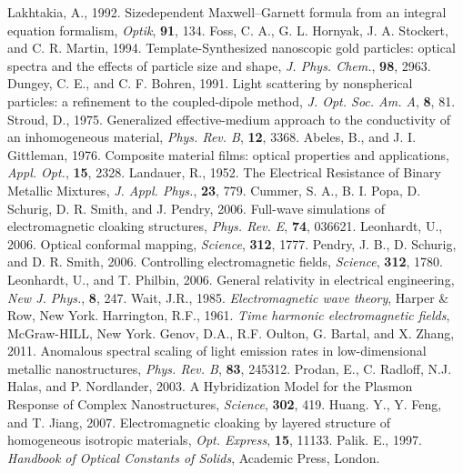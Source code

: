 \begin{thebibliography}{99}
Lakhtakia, A., 1992. Size\textendash dependent Maxwell–Garnett formula from an integral equation formalism, \textit{Optik}, \textbf{91}, 134.
Foss, C. A., G. L. Hornyak, J. A. Stockert, and C. R. Martin, 1994. Template-Synthesized nanoscopic gold particles: optical spectra and the effects of particle size and shape, \textit{J. Phys. Chem.}, \textbf{98}, 2963.
Dungey, C. E., and C. F. Bohren,  1991. Light scattering by nonspherical particles: a refinement to the coupled-dipole method, \textit{J. Opt. Soc. Am. A}, \textbf{8}, 81.
Stroud, D., 1975. Generalized effective-medium approach to the conductivity of an inhomogeneous material, \textit{Phys. Rev. B}, \textbf{12}, 3368.
Abeles, B., and J. I. Gittleman, 1976. Composite material films: optical properties and applications, \textit{Appl. Opt.}, \textbf{15}, 2328.
Landauer, R., 1952. The Electrical Resistance of Binary Metallic Mixtures, \textit{J. Appl. Phys.}, \textbf{23}, 779.
Cummer, S. A., B. I. Popa, D. Schurig, D. R. Smith, and J. Pendry, 2006. Full-wave simulations of electromagnetic cloaking structures,
\textit{Phys. Rev. E}, \textbf{74}, 036621.
Leonhardt, U., 2006. Optical conformal mapping,
\textit{Science}, \textbf{312}, 1777.
Pendry, J. B., D. Schurig, and D. R. Smith, 2006. Controlling electromagnetic fields, \textit{Science}, \textbf{312}, 1780.
Leonhardt, U., and T. Philbin, 2006. General relativity in electrical engineering, \textit{New J. Phys.}, \textbf{8}, 247.
Wait, J.R., 1985. \textit{Electromagnetic wave theory}, Harper \& Row, New York.
Harrington, R.F., 1961. \textit{Time harmonic electromagnetic fields}, McGraw-HILL, New York.
Genov, D.A.,  R.F. Oulton, G. Bartal, and X. Zhang, 2011.
Anomalous spectral scaling of light emission rates in low-dimensional metallic nanostructures, \textit{Phys. Rev. B}, \textbf{83}, 245312.
Prodan, E.,  C.  Radloff, N.J. Halas,  and P. Nordlander,  2003.
A Hybridization Model for the Plasmon Response of Complex Nanostructures, \textit{Science}, \textbf{302}, 419.
Huang. Y., Y. Feng, and T. Jiang, 2007. Electromagnetic cloaking by layered structure of homogeneous isotropic materials,  \textit{Opt. Express}, \textbf{15}, 11133.
Palik. E., 1997. \textit{Handbook of Optical Constants of Solids}, Academic Press, London.

\end{thebibliography}
